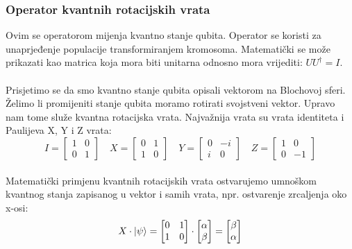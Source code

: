 \documentclass[times, utf8, zavrsni, numeric]{fer}
\begin{document}
\subsubsection{Operator kvantnih rotacijskih vrata}
Ovim se operatorom mijenja kvantno stanje qubita. Operator se koristi za unaprjeđenje populacije transformiranjem kromosoma. Matematički se može prikazati kao matrica koja mora biti unitarna odnosno mora vrijediti: $UU^{\dagger} = I$.

\paragraph{}
Prisjetimo se da smo kvantno stanje qubita opisali vektorom na Blochovoj sferi. Želimo li promijeniti stanje qubita moramo rotirati svojstveni vektor. Upravo nam tome služe kvantna rotacijska vrata. Najvažnija vrata su vrata identiteta i Paulijeva X, Y i Z vrata:
\begin{equation}
I = 
\begin{bmatrix}
1 & 0 \\ 0 & 1
\end{bmatrix} \quad
X = 
\begin{bmatrix}
0 & 1 \\ 1 & 0
\end{bmatrix} \quad
Y = 
\begin{bmatrix}
0 & -i \\ i & 0
\end{bmatrix} \quad
Z = 
\begin{bmatrix}
1 & 0 \\ 0 & -1
\end{bmatrix}
\end{equation}

\paragraph{}
Matematički primjenu kvantnih rotacijskih vrata ostvarujemo umnoškom kvantnog stanja zapisanog u vektor i samih vrata, npr. ostvarenje zrcaljenja oko x-osi:
\begin{equation}
X\cdot \ket{\psi} = 
\begin{bmatrix}
0 & 1 \\ 1 & 0
\end{bmatrix} \cdot
\begin{bmatrix}
\alpha \\ \beta
\end{bmatrix}
= \begin{bmatrix}
\beta \\ \alpha
\end{bmatrix}
\end{equation}
\end{document}
